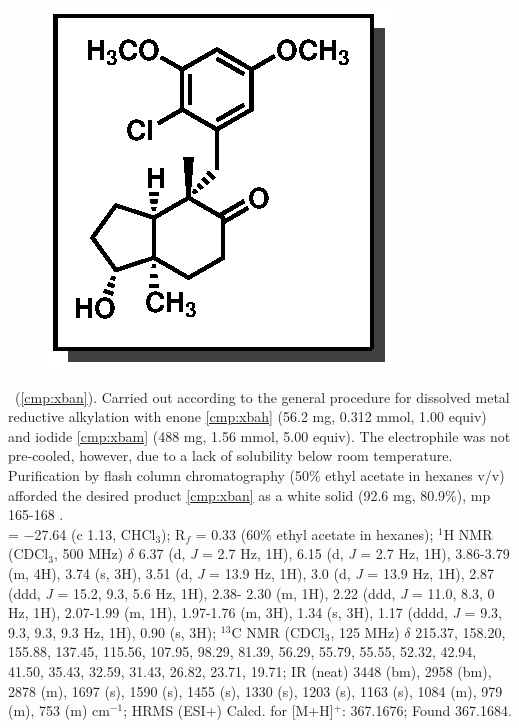 \vspace{10pt}
\begin{figure}
  \vspace{-28pt}
  \begin{center}
    \includegraphics[scale=0.8]{chp_singlecarbon/images/xban}
  \end{center}
  \vspace{-30pt}
\end{figure}\noindent \textbf{\CMPxban}\ (\ref{cmp:xban}). Carried out according to the general procedure
for dissolved metal reductive alkylation with enone \ref{cmp:xbah} (56.2 mg, 0.312 mmol,
1.00 equiv) and iodide \ref{cmp:xbam} (488 mg, 1.56 mmol, 5.00 equiv). The
electrophile was not pre-cooled, however, due to a lack of solubility
below room temperature. Purification by flash column chromatography
(50\% ethyl acetate in hexanes v/v) afforded the desired product \ref{cmp:xban} as a white solid
(92.6 mg, 80.9\%), mp 165-168 \degc. \\
\rotation = $-$27.64 (c 1.13, CHCl$_3$); R$_f$ = 0.33 (60\% ethyl acetate in hexanes); $^1$H NMR (CDCl$_3$,
500 MHz) $\delta$ 6.37 (d, \textit{J} = 2.7 Hz, 1H), 6.15 (d, \textit{J} = 2.7 Hz, 1H), 3.86-3.79 (m, 4H), 3.74 (s, 3H),
3.51 (d, \textit{J} = 13.9 Hz, 1H), 3.0 (d, \textit{J} = 13.9 Hz, 1H), 2.87 (ddd, \textit{J} = 15.2, 9.3, 5.6 Hz, 1H), 2.38-
2.30 (m, 1H), 2.22 (ddd, \textit{J} = 11.0, 8.3, 0 Hz, 1H), 2.07-1.99 (m, 1H), 1.97-1.76 (m, 3H), 1.34 (s, 3H), 1.17 (dddd, \textit{J} = 9.3, 9.3, 9.3, 9.3 Hz, 1H), 0.90 (s, 3H); $^{13}$C NMR (CDCl$_3$, 125 MHz) $\delta$ 215.37, 158.20, 155.88, 137.45, 115.56, 107.95, 98.29, 81.39, 56.29, 55.79, 55.55, 52.32,
42.94, 41.50, 35.43, 32.59, 31.43, 26.82, 23.71, 19.71; IR (neat) 3448 (bm), 2958 (bm), 2878 (m),
1697 (s), 1590 (s), 1455 (s), 1330 (s), 1203 (s), 1163 (s), 1084 (m), 979 (m), 753 (m) cm$^{-1}$;
HRMS (ESI+) Calcd. for  [M+H]$^+$: 367.1676; Found 367.1684.

